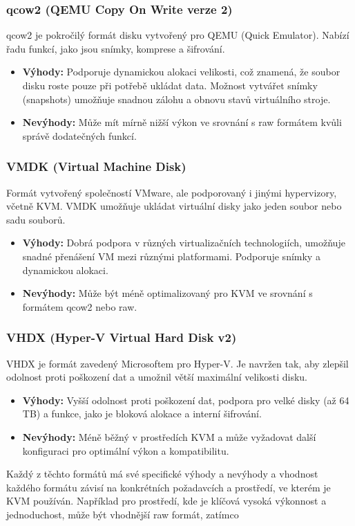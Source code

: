 \subsubsection*{qcow2 (QEMU Copy On Write verze 2)}
\noindent
qcow2 je pokročilý formát disku vytvořený pro QEMU (Quick Emulator). Nabízí řadu funkcí, jako jsou snímky, komprese a šifrování.
\begin{itemize}[label=]
\item \textbf{Výhody:} Podporuje dynamickou alokaci velikosti, což znamená, že soubor disku roste pouze při potřebě ukládat data. Možnost vytvářet snímky (snapshots) umožňuje snadnou zálohu a obnovu stavů virtuálního stroje.
\item \textbf{Nevýhody:} Může mít mírně nižší výkon ve srovnání s raw formátem kvůli správě dodatečných funkcí.
\end{itemize}

\subsubsection*{VMDK (Virtual Machine Disk)}
\noindent
Formát vytvořený společností VMware, ale podporovaný i jinými hypervizory, včetně KVM. VMDK umožňuje ukládat virtuální disky jako jeden soubor nebo sadu souborů.
\begin{itemize}[label=]
\item \textbf{Výhody:} Dobrá podpora v různých virtualizačních technologiích, umožňuje snadné přenášení VM mezi různými platformami. Podporuje snímky a dynamickou alokaci.
\item \textbf{Nevýhody:} Může být méně optimalizovaný pro KVM ve srovnání s formátem qcow2 nebo raw.
\end{itemize}

\subsubsection*{VHDX (Hyper-V Virtual Hard Disk v2)}
\noindent
VHDX je formát zavedený Microsoftem pro Hyper-V. Je navržen tak, aby zlepšil odolnost proti poškození dat a umožnil větší maximální velikosti disku.
\begin{itemize}[label=]
\item \textbf{Výhody:} Vyšší odolnost proti poškození dat, podpora pro velké disky (až 64 TB) a funkce, jako je bloková alokace a interní šifrování.
\item \textbf{Nevýhody:} Méně běžný v prostředích KVM a může vyžadovat další konfiguraci pro optimální výkon a kompatibilitu.
\end{itemize}

Každý z těchto formátů má své specifické výhody a nevýhody a vhodnost každého formátu závisí na konkrétních požadavcích a prostředí, ve kterém je KVM používán. Například pro prostředí, kde je klíčová vysoká výkonnost a jednoduchost, může být vhodnější raw formát, zatímco
